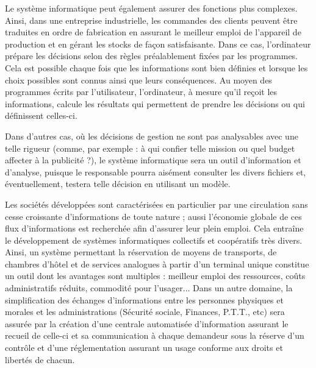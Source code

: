     Le syst\`eme informatique peut \'egalement assurer des fonctions plus complexes. Ainsi, dans une entreprise industrielle, les commandes des clients peuvent \^etre traduites en ordre de fabrication en assurant le meilleur emploi de l'appareil de production et en g\'erant les stocks de fa\c{c}on satisfaisante. Dans ce cas, l'ordinateur pr\'epare les d\'ecisions selon des r\`egles pr\'ealablement fix\'ees par les programmes. Cela est possible chaque fois que les informations sont bien d\'efinies et lorsque les choix possibles sont connus ainsi que leurs cons\'equences. Au moyen des programmes \'ecrits par l'utilisateur, l'ordinateur, \`a mesure qu'il re\c{c}oit les informations, calcule les r\'esultats qui permettent de prendre les d\'ecisions ou qui d\'efinissent celles-ci.

    Dans d'autres cas, o\`u les d\'ecisions de gestion ne sont pas analysables avec une telle rigueur (comme, par exemple : \`a qui confier telle mission ou quel budget affecter \`a la publicit\'e ?), le syst\`eme informatique sera un outil d'information et d'analyse, puisque le responsable pourra ais\'ement consulter les divers fichiers et, \'eventuellement, testera telle d\'ecision en utilisant un mod\`ele.

    Les soci\'et\'es d\'evelopp\'ees sont caract\'eris\'ees en particulier par une circulation sans cesse croissante d'informations de toute nature ; aussi l'\'economie globale de ces flux d'informations est recherch\'ee afin d'assurer leur plein emploi. Cela entra\^ine le d\'eveloppement de syst\`emes informatiques collectifs et coop\'eratifs tr\`es divers. Ainsi, un syst\`eme permettant la r\'eservation de moyens de transports, de chambres d'h\^otel et de services analogues \`a partir d'un terminal unique constitue un outil dont les avantages sont multiples : meilleur emploi des ressources, co\^uts administratifs r\'eduits, commodit\'e pour l'usager... Dans un autre domaine, la simplification des \'echanges d'informations entre les personnes physiques et morales et les administrations (S\'ecurit\'e sociale, Finances, P.T.T., etc) sera assur\'ee par la cr\'eation d'une centrale automatis\'ee d'information assurant le recueil de celle-ci et sa communication \`a chaque demandeur sous la r\'eserve d'un contr\^ole et d'une r\'eglementation assurant un usage conforme aux droits et libert\'es de chacun.

